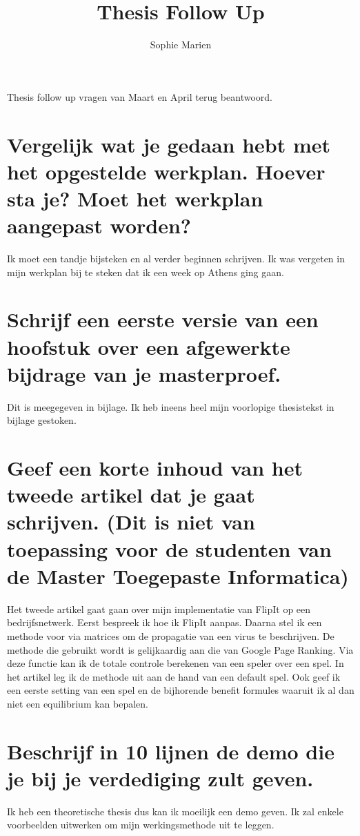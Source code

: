 \documentclass[a4paper, 11pt]{article}
\begin{document}
\begin{titlepage}
\title{Thesis Follow Up}
\author{Sophie Marien}
\date{} 
\end{titlepage}



\maketitle

Thesis follow up vragen van Maart en April terug beantwoord. 
\section{Vergelijk wat je gedaan hebt met het opgestelde werkplan. Hoever sta je? Moet het werkplan aangepast worden?}
Ik moet een tandje bijsteken en al verder beginnen schrijven. Ik was vergeten in mijn werkplan bij te steken dat ik een week op Athens ging gaan. 
\section{Schrijf een eerste versie van een hoofstuk over een afgewerkte bijdrage van je masterproef.}
Dit is meegegeven in bijlage. Ik heb ineens heel mijn voorlopige thesistekst in bijlage gestoken. 
\section{Geef een korte inhoud van het tweede artikel dat je gaat schrijven. (Dit is niet van toepassing voor de studenten van de Master Toegepaste Informatica)}
Het tweede artikel gaat gaan over mijn implementatie van FlipIt op een bedrijfsnetwerk. Eerst bespreek ik hoe ik FlipIt aanpas. Daarna stel ik een methode voor via matrices om de propagatie van een virus te beschrijven. De methode die gebruikt wordt is gelijkaardig aan die van Google Page Ranking. Via deze functie kan ik de totale controle berekenen van een speler over een spel. In het artikel leg ik de methode uit aan de hand van een default spel. 
Ook geef ik een eerste setting van een spel en de bijhorende benefit formules waaruit ik al dan niet een equilibrium kan bepalen.
\section{Beschrijf in 10 lijnen de demo die je bij je verdediging zult geven.}
Ik heb een theoretische thesis dus kan ik moeilijk een demo geven. Ik zal enkele voorbeelden uitwerken om mijn werkingsmethode uit te leggen.
\end{document}
